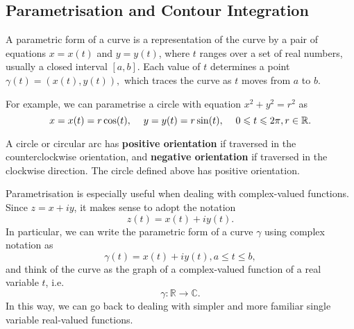 \subsection{Parametrisation and Contour Integration}

\begin{defn}[Parametrisation]
A parametric form of a curve is a representation of the curve by a pair of equations $x = x(t)$ and $y = y(t)$, where $t$ ranges over a set of real numbers, usually a closed interval $[a,b]$. Each value of $t$ determines a point $\gamma(t) = (x(t),y(t)),$ which traces the curve as $t$ moves from $a$ to $b$.
\end{defn}

For example, we can parametrise a circle with equation $x^2 + y^2 = r^2$ as
$$ x = x(t) = r\cos(t),\hspace{1pc} y = y(t) = r\sin(t),\hspace{1pc} 0 \leq t \leq 2\pi, r \in \mathbb{R}.$$ \pause

A circle or circular arc has \textbf{positive orientation} if traversed in the counterclockwise orientation, and \textbf{negative orientation} if traversed in the clockwise direction. The circle defined above has positive orientation.

Parametrisation is especially useful when dealing with complex-valued functions.
Since $z = x+iy$, it makes sense to adopt the notation $$z(t) = x(t)+iy(t).$$ 
In particular, we can write the parametric form of a curve $\gamma$ using complex notation as $$\gamma(t) = x(t)+iy(t), a \leq t \leq b,$$ and think of the curve as the graph of a complex-valued function of a real variable $t$, i.e.
$$\gamma: \mathbb{R} \rightarrow \mathbb{C}.$$
In this way, we can go back to dealing with simpler and more familiar single variable real-valued functions.


